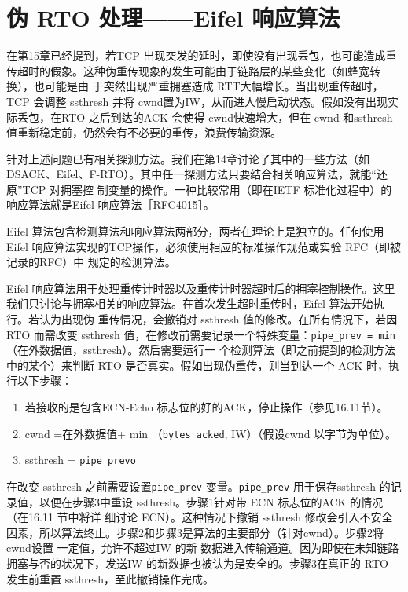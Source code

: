 \section{伪 RTO 处理——Eifel 响应算法}
在第15章已经提到，若TCP 出现突发的延时，即使没有出现丢包，也可能造成重传超时的假象。这种伪重传现象的发生可能由于链路层的某些变化（如蜂宽转换），也可能是由
于突然出现严重拥塞造成 RTT大幅增长。当出现重传超时，TCP 会调整 ssthresh 并将 cwnd置为IW，从而进人慢启动状态。假如没有出现实际丢包，在RTO 之后到达的ACK 会使得
cwnd快速增大，但在 cwnd 和ssthresh 值重新稳定前，仍然会有不必要的重传，浪费传输资源。

针对上述问题已有相关探测方法。我们在第14章讨论了其中的一些方法（如DSACK、Eifel、F-RTO）。其中任一探测方法只要结合相关响应算法，就能“还原”TCP 对拥塞控
制变量的操作。一种比较常用（即在IETF 标准化过程中）的响应算法就是Eifel 响应算法［RFC4015］。

Eifel 算法包含检测算法和响应算法两部分，两者在理论上是独立的。任何使用 Eifel 响应算法实现的TCP操作，必须使用相应的标准操作规范或实验 RFC（即被记录的RFC）中
规定的检测算法。

Eifel 响应算法用于处理重传计时器以及重传计时器超时后的拥塞控制操作。这里我们只讨论与拥塞相关的响应算法。在首次发生超时重传时，Eifel 算法开始执行。若认为出现伪
重传情况，会撤销对 ssthresh 值的修改。在所有情况下，若因 RTO 而需改变 ssthresh 值，在修改前需要记录一个特殊变量：\verb|pipe_prev = min|（在外数据值，ssthresh）。然后需要运行一
个检测算法（即之前提到的检测方法中的某个）来判断 RTO 是否真实。假如出现伪重传，则当到达一个 ACK 时，执行以下步骤：

\begin{enumerate}
    \item 若接收的是包含ECN-Echo 标志位的好的ACK，停止操作（参见16.11节）。
    \item cwnd =在外数据值+ min （\verb|bytes_acked|, IW）（假设cwnd 以字节为单位）。
    \item ssthresh = \verb|pipe_prevo|
\end{enumerate}

在改变 ssthresh 之前需要设置\verb|pipe_prev| 变量。\verb|pipe_prev| 用于保存ssthresh 的记录值，以便在步骤3中重设 ssthresh。步骤1针对带 ECN 标志位的ACK 的情况（在16.11 节中将详
细讨论 ECN）。这种情况下撤销 ssthresh 修改会引入不安全因素，所以算法终止。步骤2和步骤3是算法的主要部分（针对cwnd）。步骤2将cwnd设置 一定值，允许不超过IW 的新
数据进入传输通道。因为即使在未知链路拥塞与否的状况下，发送IW 的新数据也被认为是安全的。步骤3在真正的 RTO 发生前重置 ssthresh，至此撤销操作完成。

